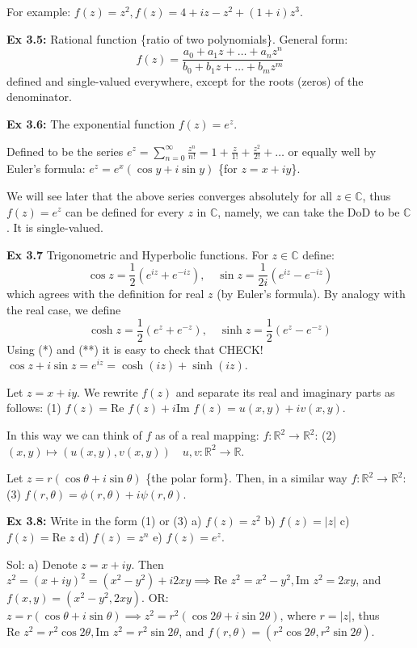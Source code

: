 \documentclass{article}
\begin{document}
For example: $f(z) = z^2, f(z) = 4 + iz - z^2 + (1 + i)z^3$.

\textbf{Ex 3.5:} Rational function \{ratio of two polynomials\}. General form:
$$f(z) = \frac{a_0 + a_1 z + \dots + a_n z^n}{b_0 + b_1 z + \dots + b_m z^m}$$
defined and single-valued everywhere, except for the roots (zeros) of the denominator.

\textbf{Ex 3.6:} The exponential function $f(z) = e^z$.

Defined to be the series $e^z = \sum_{n=0}^{\infty} \frac{z^n}{n!} = 1 + \frac{z}{1!} + \frac{z^2}{2!} + \dots$ or equally well by Euler's formula: $e^z = e^x(\cos y + i\sin y)$ \{for $z = x + iy$\}.

We will see later that the above series converges absolutely for all $z \in \mathbb{C}$, thus $f(z) = e^z$ can be defined for every $z$ in $\mathbb{C}$, namely, we can take the DoD to be $\mathbb{C}$. It is single-valued.

\textbf{Ex 3.7} Trigonometric and Hyperbolic functions. For $z \in \mathbb{C}$ define:
$$\cos z = \frac{1}{2}(e^{iz} + e^{-iz}), \quad \sin z = \frac{1}{2i}(e^{iz} - e^{-iz})$$
which agrees with the definition for real $z$ (by Euler's formula). By analogy with the real case, we define
$$\cosh z = \frac{1}{2}(e^z + e^{-z}), \quad \sinh z = \frac{1}{2}(e^z - e^{-z})$$
Using (*) and (**) it is easy to check that CHECK! $\cos z + i\sin z = e^{iz} = \cosh(iz) + \sinh(iz)$.

Let $z = x + iy$. We rewrite $f(z)$ and separate its real and imaginary parts as follows:
(1) $f(z) = \text{Re } f(z) + i\text{Im } f(z) = u(x, y) + iv(x, y)$.

In this way we can think of $f$ as of a real mapping:
$f: \mathbb{R}^2 \to \mathbb{R}^2$: (2) $(x, y) \mapsto (u(x, y), v(x, y)) \quad u, v: \mathbb{R}^2 \to \mathbb{R}$.

Let $z = r(\cos \theta + i\sin \theta)$ \{the polar form\}. Then, in a similar way $f: \mathbb{R}^2 \to \mathbb{R}^2$: (3) $f(r, \theta) = \phi(r, \theta) + i\psi(r, \theta)$.

\textbf{Ex 3.8:} Write in the form (1) or (3)
a) $f(z) = z^2$ b) $f(z) = \vert z\vert $ c) $f(z) = \text{Re } z$ d) $f(z) = z^n$ e) $f(z) = e^z$.

Sol: a) Denote $z = x + iy$. Then $z^2 = (x + iy)^2 = (x^2 - y^2) + i2xy \implies \text{Re } z^2 = x^2 - y^2, \text{Im } z^2 = 2xy$, and $f(x, y) = (x^2 - y^2, 2xy)$.
OR: $z = r(\cos \theta + i\sin \theta) \implies z^2 = r^2(\cos 2\theta + i\sin 2\theta)$, where $r = \vert z\vert $, thus $\text{Re } z^2 = r^2 \cos 2\theta, \text{Im } z^2 = r^2 \sin 2\theta$, and $f(r, \theta) = (r^2 \cos 2\theta, r^2 \sin 2\theta)$.
\end{document}

